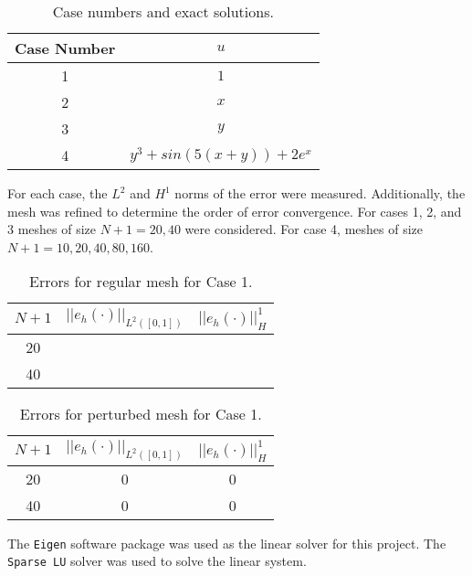 \documentclass[a4paper, 12pt]{article}
\begin{document}
\begin{table}[!ht]
\caption{ Case numbers and exact solutions.}
\vspace{0.1in}
\centering
\begin{tabular}{ |c|c|}
  \hline
  Case Number  & $u$ \\
  \hline
  1            &  $1$ \\
  \hline
  2            &  $x$ \\
  \hline
  3            &  $y$ \\
  \hline
  4            &  $y^3 + sin( 5(x+y)) + 2e^x$ \\
  \hline
\end{tabular}
\label{t:cases}
\end{table}

\noindent
For each case, the $L^2$ and $H^1$ norms of the error were measured. 
Additionally, the mesh was refined to determine the order of 
error convergence. For cases 1, 2, and 3 meshes of size $N+1 = 20, 40$
were considered. For case 4, meshes of size $N+1 = 10, 20, 40, 80, 160$.

\begin{table}[!ht]
\caption{Errors for regular mesh for Case 1.}
\vspace{0.1in}
\centering
\begin{tabular}{|c|c|c|}
\hline
 $N+1$&  $||e_h(\cdot)||_{L^2([0,1])}$ & $||e_h(\cdot)||_H^1$ \\
 \hline
     20  &  & \\
     40  &  & \\
\hline
\end{tabular}
\label{tab:C1o}
\end{table}

\begin{table}[!ht]
\caption{Errors for perturbed mesh for Case 1.}
\vspace{0.1in}
\centering
\begin{tabular}{|c|c|c|}
\hline
 $N+1$  & $||e_h(\cdot)||_{L^2([0,1])}$ & $||e_h(\cdot)||_H^1$ \\
 \hline
     20  & 0 & 0 \\
     40  & 0 & 0 \\
\hline
\end{tabular}
\label{tab:C1p}
\end{table}


The \texttt{Eigen} software package
was used as the linear solver for this project. 
The \texttt{Sparse LU} solver was used to 
solve the linear system.
\end{document}
